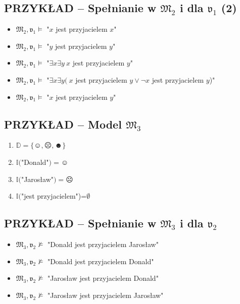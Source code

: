 \documentclass[12pt]{article}
\begin{document}
\subsection{PRZYKŁAD -- Spełnianie w $\mathfrak{M}_2$ i dla $\mathfrak{v}_1$ (2)}
%
\begin{itemize}
\item $\mathfrak{M}_2,\mathfrak{v}_1 \vDash$ "$x$ jest przyjacielem $x$"%
\item $\mathfrak{M}_2,\mathfrak{v}_1 \vDash$ "$y$ jest przyjacielem $y$"%
\item $\mathfrak{M}_2,\mathfrak{v}_1 \vDash$ "$\exists x \exists y ~x$ jest przyjacielem $y$"%
\item $\mathfrak{M}_2,\mathfrak{v}_1 \vDash$ "$\exists x \exists y ( ~x$ jest przyjacielem $y \lor \neg x$ jest przyjacielem $y$)"%
\item $\mathfrak{M}_2,\mathfrak{v}_1 \vDash$ "$x$ jest przyjacielem $y$"
\end{itemize}
%

\subsection{PRZYKŁAD -- Model $\mathfrak{M}_3$}
%
\begin{enumerate}
    \item $\mathbb{D} = \{\smiley{}, \frownie{}, \blacksmiley{} \}$%
    \item $\mathbb{I}($"Donald"$)=\smiley{}$%
    \item $\mathbb{I}($"Jarosław"$)=\frownie{}$%
    \item $\mathbb{I}($"jest przyjacielem")=$\emptyset$
\end{enumerate}
%


\subsection{PRZYKŁAD -- Spełnianie w $\mathfrak{M}_3$ i dla $\mathfrak{v}_2$}
%
\begin{itemize}
\item $\mathfrak{M}_3,\mathfrak{v}_2 \not \vDash$ "Donald jest przyjacielem Jarosław"%
\item $\mathfrak{M}_3,\mathfrak{v}_2 \not \vDash$ "Donald jest przyjacielem Donald"%
\item $\mathfrak{M}_3,\mathfrak{v}_2 \not \vDash$ "Jarosław jest przyjacielem Donald"%
\item $\mathfrak{M}_3,\mathfrak{v}_2 \not \vDash$ "Jarosław jest przyjacielem Jarosław"
\end{itemize}
%
\end{document}
